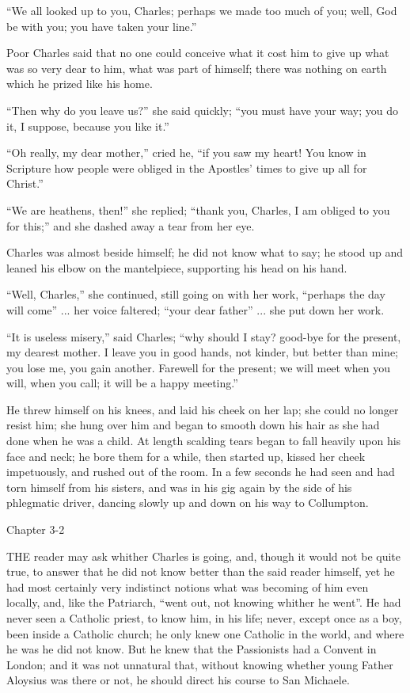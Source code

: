 ``We all looked up to you, Charles; perhaps we made too much of
you; well, God be with you; you have taken your line.''

Poor Charles said that no one could conceive what it cost him to
give up what was so very dear to him, what was part of himself; there
was nothing on earth which he prized like his home.

``Then why do you leave us?'' she said quickly; ``you
must have your way; you do it, I suppose, because you like it.''

``Oh really, my dear mother,'' cried he, ``if you saw
my heart! You know in Scripture how people were obliged in the
Apostles' times to give up all for Christ.''

``We are heathens, then!'' she replied; ``thank you,
Charles, I am obliged to you for this;'' and she dashed away
a tear from her eye.

Charles was almost beside himself; he did not know what to say; he
stood up and leaned his elbow on the mantelpiece, supporting his head
on his hand.

``Well, Charles,'' she continued, still going on with her
work, ``perhaps the day will come'' ... her voice faltered;
``your dear father'' ... she put down her work.

``It is useless misery,'' said Charles; ``why should I
stay? good-bye for the present, my dearest mother. I leave you in good
hands, not kinder, but better than mine; you lose me, you gain
another. Farewell for the present; we will meet when you will, when
you call; it will be a happy meeting.''

He threw himself on his knees, and laid his cheek on her lap; she
could no longer resist him; she hung over him and began to smooth down
his hair as she had done when he was a child. At length scalding tears
began to fall heavily upon his face and neck; he bore them for a
while, then started up, kissed her cheek impetuously, and rushed out
of the room. In a few seconds he had seen and had torn himself from
his sisters, and was in his gig again by the side of his phlegmatic
driver, dancing slowly up and down on his way to Collumpton.

Chapter 3-2


THE reader may ask whither Charles is
going, and, though it would not be quite true, to answer that he did
not know better than the said reader himself, yet he had most
certainly very indistinct notions what was becoming of him even
locally, and, like the Patriarch, ``went out, not knowing whither
he went''. He had never seen a Catholic priest, to know him, in
his life; never, except once as a boy, been inside a Catholic church;
he only knew one Catholic in the world, and where he was he did not
know. But he knew that the Passionists had a Convent in London; and it
was not unnatural that, without knowing whether young Father Aloysius
was there or not, he should direct his course to San Michaele.

